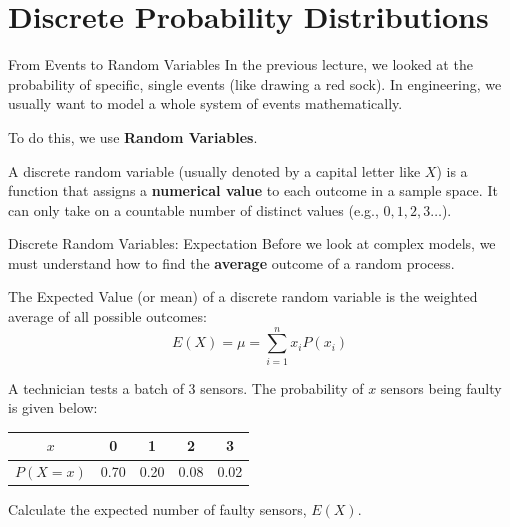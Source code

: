 \section{Discrete Probability Distributions}

\begin{frame}{From Events to Random Variables}
    In the previous lecture, we looked at the probability of specific, single events (like drawing a red sock). In engineering, we usually want to model a whole system of events mathematically. 
    
    To do this, we use \textbf{Random Variables}.
    
    \vspace{0.3cm}
    \begin{definition}
        A discrete random variable (usually denoted by a capital letter like $X$) is a function that assigns a \textbf{numerical value} to each outcome in a sample space. It can only take on a countable number of distinct values (e.g., $0, 1, 2, 3\dots$).
    \end{definition}

\end{frame}

\begin{frame}[allowframebreaks]{Discrete Random Variables: Expectation}
    Before we look at complex models, we must understand how to find the \textbf{average} outcome of a random process.
    
    \begin{definition}
        The Expected Value (or mean) of a discrete random variable is the weighted average of all possible outcomes:
        \[ E(X) = \mu = \sum_{i=1}^{n} x_i P(x_i) \]
    \end{definition}

    \begin{example}
        A technician tests a batch of 3 sensors. The probability of $x$ sensors being faulty is given below:
        \begin{center}
        \begin{tabular}{|c|c|c|c|c|}
        \hline
        $x$ & 0 & 1 & 2 & 3 \\ \hline
        $P(X=x)$ & 0.70 & 0.20 & 0.08 & 0.02 \\ \hline
        \end{tabular}
        \end{center}
        Calculate the expected number of faulty sensors, $E(X)$.
    \end{example}
\end{frame}

